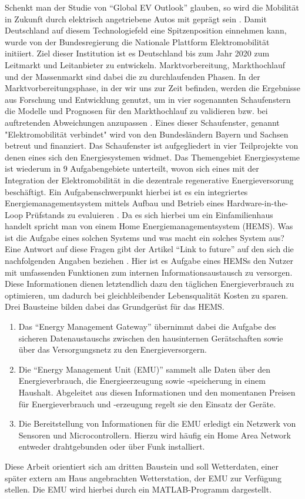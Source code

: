 Schenkt man der Studie von \enquote{Global EV Outlook} glauben, so wird die Mobilität in Zukunft durch elektrisch angetriebene Autos mit geprägt sein \cite{EVOutlook}. Damit Deutschland auf diesem Technologiefeld eine Spitzenposition einnehmen kann, wurde von der Bundesregierung die Nationale Plattform Elektromobilität initiiert. Ziel dieser Institution ist es Deutschland bis zum Jahr 2020 zum Leitmarkt und Leitanbieter zu entwickeln. Marktvorbereitung, Markthochlauf und der Massenmarkt sind dabei die zu durchlaufenden Phasen. In der Marktvorbereitungsphase, in der wir uns zur Zeit befinden, werden die Ergebnisse aus Forschung und Entwicklung genutzt, um in vier sogenannten Schaufenstern die Modelle und Prognosen für den Markthochlauf zu validieren bzw. bei auftretenden Abweichungen anzupassen \cite{NPE}. Eines dieser Schaufenster, genannt "{}Elektromobilität verbindet"{} wird von den Bundesländern Bayern und Sachsen betreut und finanziert. Das Schaufenster ist aufgegliedert in vier Teilprojekte von denen eines sich den Energiesystemen widmet. Das Themengebiet Energiesysteme ist wiederum in 9 Aufgabengebiete unterteilt, wovon sich eines mit der Integration der Elektromobilität in die dezentrale regenerative Energieversorung beschäftigt. Ein Aufgabenschwerpunkt hierbei ist es ein integriertes Energiemanagementsystem mittels Aufbau und Betrieb eines Hardware-in-the-Loop Prüfstands zu evaluieren \cite{SEEV}. Da es sich hierbei um ein Einfamilienhaus handelt spricht man von einem Home Energiemanagementsystem (HEMS). Was ist die Aufgabe eines solchen Systems und was macht ein solches System aus? Eine Antwort auf diese Fragen gibt der Artikel \enquote{Link to future} auf den sich die nachfolgenden Angaben beziehen \cite{LtoF}. Hier ist es Aufgabe eines HEMSs den Nutzer mit umfassenden Funktionen zum internen Informationsaustausch zu versorgen. Diese Informationen dienen letztendlich dazu den täglichen Energieverbrauch zu optimieren, um dadurch bei gleichbleibender Lebensqualität Kosten zu sparen. Drei Bausteine bilden dabei das Grundgerüst für das HEMS. 
\begin{enumerate}
\item Das \enquote{Energy Management Gateway} übernimmt dabei die Aufgabe des sicheren Datenaustauschs zwischen den hausinternen Gerätschaften sowie über das Versorgungsnetz zu den Energieversorgern. 
\item Die \enquote{Energy Management Unit (EMU)} sammelt alle Daten über den Energieverbrauch, die Energieerzeugung sowie -speicherung in einem Haushalt. Abgeleitet aus diesen Informationen und den momentanen Preisen für Energieverbrauch und -erzeugung regelt sie den Einsatz der Geräte. 
\item Die Bereitstellung von Informationen für die EMU erledigt ein Netzwerk von Sensoren und Microcontrollern. Hierzu wird häufig ein Home Area Network entweder drahtgebunden oder über Funk installiert.     
\end{enumerate} 
Diese Arbeit orientiert sich am dritten Baustein und soll Wetterdaten, einer später extern am Haus angebrachten Wetterstation, der EMU zur Verfügung stellen. Die EMU wird hierbei durch ein MATLAB-Programm dargestellt. 